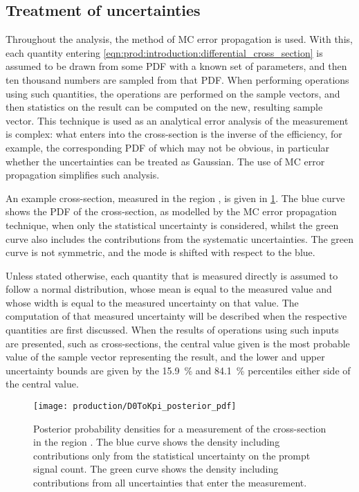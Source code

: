 \subsection{Treatment of uncertainties}
\label{chap:prod:introduction:uncertainties}

Throughout the analysis, the method of \acl{MC} error propagation is used.
With this, each quantity entering 
\cref{eqn:prod:introduction:differential_cross_section} is assumed to be drawn 
from some \acf{PDF} with a known set of parameters, and then ten thousand 
numbers are sampled from that \ac{PDF}.
When performing operations using such quantities, the operations are performed 
on the sample vectors, and then statistics on the result can be computed on the 
new, resulting sample vector.
This technique is used as an analytical error analysis of the measurement is 
complex: what enters into the cross-section is the inverse of the efficiency, 
for example, the corresponding \acl{PDF} of which may not be obvious, in 
particular whether the uncertainties can be treated as Gaussian.
The use of \acl{MC} error propagation simplifies such analysis.

An example cross-section, measured in the region , is 
given in \cref{fig::prod:introduction:uncertainties:posterior}.
The blue curve shows the \ac{PDF} of the cross-section, as modelled by the 
\ac{MC} error propagation technique, when only the statistical uncertainty is 
considered, whilst the green curve also includes the contributions from the 
systematic uncertainties.
The green curve is not symmetric, and the mode is shifted with respect to the 
blue.

Unless stated otherwise, each quantity that is measured directly is assumed to 
follow a normal distribution, whose mean is equal to the measured value and 
whose width is equal to the measured uncertainty on that value.
The computation of that measured uncertainty will be described when the 
respective quantities are first discussed.
When the results of operations using such inputs are presented, such as 
cross-sections, the central value given is the most probable value of the 
sample vector representing the result, and the lower and upper uncertainty 
bounds are given by the \SI{15.9}{\percent} and \SI{84.1}{\percent} percentiles 
either side of the central value.

\begin{figure}
  \centering
  \texttt{[image: production/D0ToKpi\_posterior\_pdf]}
  \caption{%
    Posterior probability densities for a measurement of the \PDzero 
    cross-section in the region .
    The blue curve shows the density including contributions only from the 
    statistical uncertainty on the prompt signal count.
    The green curve shows the density including contributions from all 
    uncertainties that enter the measurement.
  }
  \label{fig::prod:introduction:uncertainties:posterior}
\end{figure}

